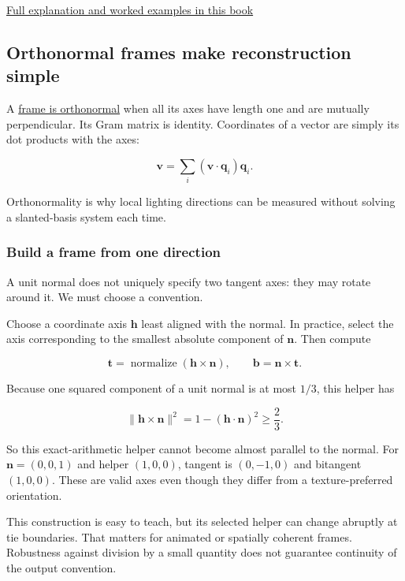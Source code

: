\hyperref[01-foundations-i-ch019]{Full explanation and worked examples in this book}

\subsection{Orthonormal frames make reconstruction simple}\label{orthonormal-frames-make-reconstruction-simple}

A \hyperref[01-foundations-i-ch017]{frame is orthonormal} when all its axes have length one and are mutually perpendicular. Its Gram matrix is identity. Coordinates of a vector are simply its dot products with the axes:

\[
\mathbf v=\sum_i(\mathbf v\cdot\mathbf q_i)\mathbf q_i.
\]

Orthonormality is why local lighting directions can be measured without solving a slanted-basis system each time.

\subsubsection{Build a frame from one direction}\label{build-a-frame-from-one-direction}

A unit normal does not uniquely specify two tangent axes: they may rotate around it. We must choose a convention.

Choose a coordinate axis \(\mathbf h\) least aligned with the normal. In practice, select the axis corresponding to the smallest absolute component of \(\mathbf n\). Then compute

\[
\mathbf t=\operatorname{normalize}(\mathbf h\times\mathbf n),
\qquad \mathbf b=\mathbf n\times\mathbf t.
\]

Because one squared component of a unit normal is at most \(1/3\), this helper has

\[
\|\mathbf h\times\mathbf n\|^2
=1-(\mathbf h\cdot\mathbf n)^2\ge\frac23.
\]

So this exact-arithmetic helper cannot become almost parallel to the normal. For \(\mathbf n=(0,0,1)\) and helper \((1,0,0)\), tangent is \((0,-1,0)\) and bitangent \((1,0,0)\). These are valid axes even though they differ from a texture-preferred orientation.

This construction is easy to teach, but its selected helper can change abruptly at tie boundaries. That matters for animated or spatially coherent frames. Robustness against division by a small quantity does not guarantee continuity of the output convention.

